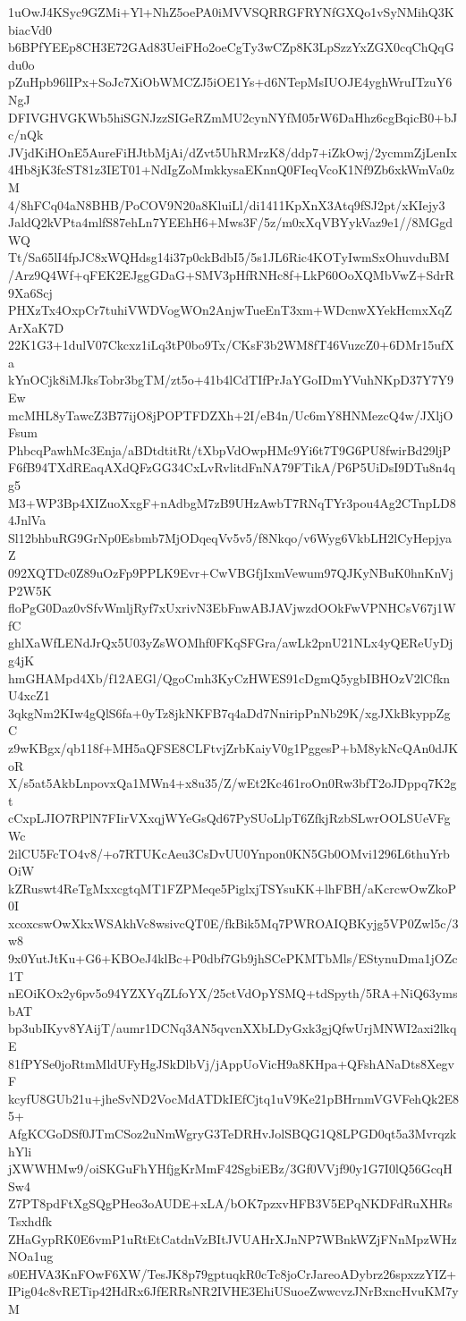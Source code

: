 1uOwJ4KSyc9GZMi+Yl+NhZ5oePA0iMVVSQRRGFRYNfGXQo1vSyNMihQ3KbiacVd0
b6BPfYEEp8CH3E72GAd83UeiFHo2oeCgTy3wCZp8K3LpSzzYxZGX0cqChQqGdu0o
pZuHpb96lIPx+SoJc7XiObWMCZJ5iOE1Ys+d6NTepMsIUOJE4yghWruITzuY6NgJ
DFIVGHVGKWb5hiSGNJzzSIGeRZmMU2cynNYfM05rW6DaHhz6cgBqicB0+bJc/nQk
JVjdKiHOnE5AureFiHJtbMjAi/dZvt5UhRMrzK8/ddp7+iZkOwj/2ycmmZjLenIx
4Hb8jK3fcST81z3IET01+NdIgZoMmkkysaEKnnQ0FIeqVcoK1Nf9Zb6xkWmVa0zM
4/8hFCq04aN8BHB/PoCOV9N20a8KluiLl/di1411KpXnX3Atq9fSJ2pt/xKIejy3
JaldQ2kVPta4mlfS87ehLn7YEEhH6+Mws3F/5z/m0xXqVBYykVaz9e1//8MGgdWQ
Tt/Sa65lI4fpJC8xWQHdsg14i37p0ckBdbI5/5s1JL6Ric4KOTyIwmSxOhuvduBM
/Arz9Q4Wf+qFEK2EJggGDaG+SMV3pHfRNHc8f+LkP60OoXQMbVwZ+SdrR9Xa6Scj
PHXzTx4OxpCr7tuhiVWDVogWOn2AnjwTueEnT3xm+WDcnwXYekHcmxXqZArXaK7D
22K1G3+1dulV07Ckcxz1iLq3tP0bo9Tx/CKsF3b2WM8fT46VuzcZ0+6DMr15ufXa
kYnOCjk8iMJksTobr3bgTM/zt5o+41b4lCdTIfPrJaYGoIDmYVuhNKpD37Y7Y9Ew
mcMHL8yTawcZ3B77ijO8jPOPTFDZXh+2I/eB4n/Uc6mY8HNMezcQ4w/JXljOFsum
PhbcqPawhMc3Enja/aBDtdtitRt/tXbpVdOwpHMc9Yi6t7T9G6PU8fwirBd29ljP
F6fB94TXdREaqAXdQFzGG34CxLvRvlitdFnNA79FTikA/P6P5UiDsI9DTu8n4qg5
M3+WP3Bp4XIZuoXxgF+nAdbgM7zB9UHzAwbT7RNqTYr3pou4Ag2CTnpLD84JnlVa
Sl12bhbuRG9GrNp0Esbmb7MjODqeqVv5v5/f8Nkqo/v6Wyg6VkbLH2lCyHepjyaZ
092XQTDc0Z89uOzFp9PPLK9Evr+CwVBGfjIxmVewum97QJKyNBuK0hnKnVjP2W5K
floPgG0Daz0vSfvWmljRyf7xUxrivN3EbFnwABJAVjwzdOOkFwVPNHCsV67j1WfC
ghlXaWfLENdJrQx5U03yZsWOMhf0FKqSFGra/awLk2pnU21NLx4yQEReUyDjg4jK
hmGHAMpd4Xb/f12AEGl/QgoCmh3KyCzHWES91cDgmQ5ygbIBHOzV2lCfknU4xcZ1
3qkgNm2KIw4gQlS6fa+0yTz8jkNKFB7q4aDd7NniripPnNb29K/xgJXkBkyppZgC
z9wKBgx/qb118f+MH5aQFSE8CLFtvjZrbKaiyV0g1PggesP+bM8ykNcQAn0dJKoR
X/s5at5AkbLnpovxQa1MWn4+x8u35/Z/wEt2Kc461roOn0Rw3bfT2oJDppq7K2gt
cCxpLJIO7RPlN7FIirVXxqjWYeGsQd67PySUoLlpT6ZfkjRzbSLwrOOLSUeVFgWc
2ilCU5FcTO4v8/+o7RTUKcAeu3CsDvUU0Ynpon0KN5Gb0OMvi1296L6thuYrbOiW
kZRuswt4ReTgMxxcgtqMT1FZPMeqe5PiglxjTSYsuKK+lhFBH/aKcrcwOwZkoP0I
xcoxcswOwXkxWSAkhVc8wsivcQT0E/fkBik5Mq7PWROAIQBKyjg5VP0Zwl5c/3w8
9x0YutJtKu+G6+KBOeJ4klBc+P0dbf7Gb9jhSCePKMTbMls/EStynuDma1jOZc1T
nEOiKOx2y6pv5o94YZXYqZLfoYX/25ctVdOpYSMQ+tdSpyth/5RA+NiQ63ymsbAT
bp3ubIKyv8YAijT/aumr1DCNq3AN5qvcnXXbLDyGxk3gjQfwUrjMNWI2axi2lkqE
81fPYSe0joRtmMldUFyHgJSkDlbVj/jAppUoVicH9a8KHpa+QFshANaDts8XegvF
kcyfU8GUb21u+jheSvND2VocMdATDkIEfCjtq1uV9Ke21pBHrnmVGVFehQk2E85+
AfgKCGoDSf0JTmCSoz2uNmWgryG3TeDRHvJolSBQG1Q8LPGD0qt5a3MvrqzkhYli
jXWWHMw9/oiSKGuFhYHfjgKrMmF42SgbiEBz/3Gf0VVjf90y1G7I0lQ56GcqHSw4
Z7PT8pdFtXgSQgPHeo3oAUDE+xLA/bOK7pzxvHFB3V5EPqNKDFdRuXHRsTsxhdfk
ZHaGypRK0E6vmP1uRtEtCatdnVzBItJVUAHrXJnNP7WBnkWZjFNnMpzWHzNOa1ug
s0EHVA3KnFOwF6XW/TesJK8p79gptuqkR0cTc8joCrJareoADybrz26spxzzYIZ+
IPig04c8vRETip42HdRx6JfERRsNR2IVHE3EhiUSuoeZwwcvzJNrBxncHvuKM7yM
